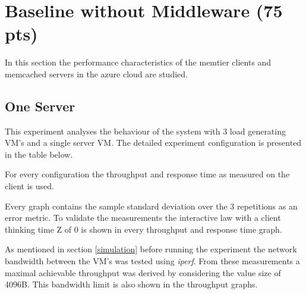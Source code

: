 \documentclass[11pt,a4paper]{article}
\begin{document}
\section{Baseline without Middleware (75 pts)}

In this section the performance characteristics of the memtier clients and memcached servers in the azure cloud are studied.

\subsection{One Server}



This experiment analyses the behaviour of the system with 3 load generating VM's and a single server VM. The detailed experiment configuration is presented in the table below.

For every configuration the throughput and response time as measured on the client is used.

Every graph contains the sample standard deviation over the 3 repetitions as an error metric.
To validate the measurements the interactive law with a client thinking time Z of 0 is shown in every throughput and response time graph.

As mentioned in section \ref{simulation} before running the experiment the network bandwidth between the VM's was tested using \emph{iperf}. From these measurements a maximal achievable throughput was derived by considering the value size of 4096B. This bandwidth limit is also shown in the throughput graphs.
\end{document}
